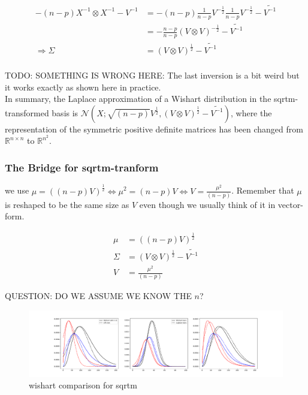\begin{align*}
-(n-p) X^{-1} \otimes X^{-1} - V^{-1} &= -(n-p) \frac{1}{n-p}V^{-\frac{1}{2}} \frac{1}{n-p}V^{-\frac{1}{2}} - \tilde{V^{-1}} \\
&= -\frac{n-p}{n-p}(V \otimes V)^{-\frac{1}{2}} - \tilde{V^{-1}}\\
\Rightarrow \Sigma &= (V \otimes V)^{\frac{1}{2}} - \tilde{V^{-1}}\\
\end{align*}

TODO: SOMETHING IS WRONG HERE: The last inversion is a bit weird but it works exactly as shown here in practice.\\

In summary, the Laplace approximation of a Wishart distribution in the sqrtm-transformed basis is $\mathcal{N}\left(X; \sqrt{(n-p)}V^{\frac{1}{2}}, (V \otimes V)^{\frac{1}{2}} - \tilde{V^{-1}} \right)$, where the representation of the symmetric positive definite matrices has been changed from $\mathbb{R}^{n\times n}$ to $\mathbb{R}^{n^2}$.

\subsubsection{The Bridge for sqrtm-tranform}

we use $\mu =  ((n-p)V)^{\frac{1}{2}} \Leftrightarrow \mu^2 = (n-p)V \Leftrightarrow V = \frac{\mu^2}{(n-p)}$. Remember that $\mu$ is reshaped to be the same size as $V$ even though we usually think of it in vector-form. 

\begin{align}
	\mu &=  ((n-p)V)^{\frac{1}{2}} \\
	\Sigma &= (V \otimes V)^{\frac{1}{2}} - \tilde{V^{-1}} \\
	V &= \frac{\mu^2}{(n-p)}
\end{align}

QUESTION: DO WE ASSUME WE KNOW THE $n$? 

\begin{figure}[!htb]
	\centering
	\includegraphics[width=\textwidth]{figures/wishart_playground_sqrtm.pdf}
	\caption{wishart comparison for sqrtm}
	\label{fig:wishart_comparison}
\end{figure}


